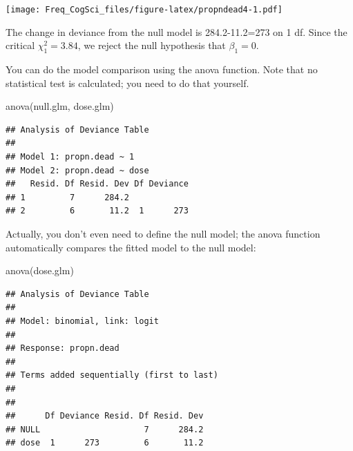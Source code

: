 \documentclass[
  12pt,
]{krantz}
\newenvironment{Shaded}{\begin{snugshade}}{\end{snugshade}}
\newcommand{\AttributeTok}[1]{\textcolor[rgb]{0.77,0.63,0.00}{#1}}
\newcommand{\DecValTok}[1]{\textcolor[rgb]{0.00,0.00,0.81}{#1}}
\newcommand{\FunctionTok}[1]{\textcolor[rgb]{0.00,0.00,0.00}{#1}}
\newcommand{\NormalTok}[1]{#1}
\newcommand{\SpecialCharTok}[1]{\textcolor[rgb]{0.00,0.00,0.00}{#1}}
\newcommand{\StringTok}[1]{\textcolor[rgb]{0.31,0.60,0.02}{#1}}
\theoremstyle{definition}
\theoremstyle{definition}
\theoremstyle{definition}
\theoremstyle{definition}
\theoremstyle{remark}
\begin{document}
\begin{Shaded}
\end{Shaded}

\texttt{[image: Freq\_CogSci\_files/figure-latex/propndead4-1.pdf]}

The change in deviance from the null model is 284.2-11.2=273 on 1 df. Since the critical \(\chi_1^2 = 3.84\), we reject the null hypothesis that \(\beta_1 = 0\).

You can do the model comparison using the anova function. Note that no statistical test is calculated; you need to do that yourself.

\begin{Shaded}
\begin{Highlighting}[]
\FunctionTok{anova}\NormalTok{(null.glm, dose.glm)}
\end{Highlighting}
\end{Shaded}

\begin{verbatim}
## Analysis of Deviance Table
## 
## Model 1: propn.dead ~ 1
## Model 2: propn.dead ~ dose
##   Resid. Df Resid. Dev Df Deviance
## 1         7      284.2            
## 2         6       11.2  1      273
\end{verbatim}

Actually, you don't even need to define the null model; the anova function automatically compares the fitted model to the null model:

\begin{Shaded}
\begin{Highlighting}[]
\FunctionTok{anova}\NormalTok{(dose.glm)}
\end{Highlighting}
\end{Shaded}

\begin{verbatim}
## Analysis of Deviance Table
## 
## Model: binomial, link: logit
## 
## Response: propn.dead
## 
## Terms added sequentially (first to last)
## 
## 
##      Df Deviance Resid. Df Resid. Dev
## NULL                     7      284.2
## dose  1      273         6       11.2
\end{verbatim}
\end{document}
